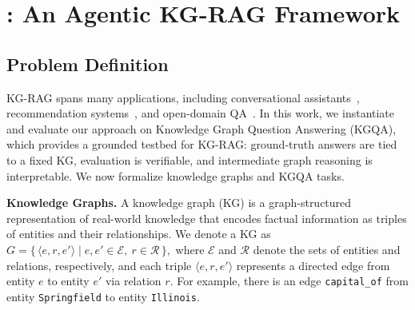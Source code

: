 \section{\framework{}: An Agentic KG-RAG Framework}
\label{sec:kg_r1}

\subsection{Problem Definition}

KG-RAG spans many applications, including conversational assistants~\citep{chaudhuri2021grounding}, recommendation systems~\citep{wang2025knowledge}, and open-domain QA~\citep{zhu2025knowledgegraphguidedretrievalaugmented}. In this work, we instantiate and evaluate our approach on Knowledge Graph Question Answering (KGQA), which provides a grounded testbed for KG-RAG: ground-truth answers are tied to a fixed KG, evaluation is verifiable, and intermediate graph reasoning is interpretable. We now formalize knowledge graphs and KGQA tasks.


\noindent\textbf{Knowledge Graphs.} A knowledge graph (KG) is a graph-structured representation of real-world knowledge that encodes factual information as triples of entities and their relationships. We denote a KG as
\(
G=\{\,\langle e,r,e'\rangle \mid e,e'\!\in\!\mathcal{E},\ r\!\in\!\mathcal{R}\,\},
\)
where \(\mathcal{E}\) and \(\mathcal{R}\) denote the sets of entities and relations, respectively, and each triple \(\langle e,r,e'\rangle\) represents a directed edge from entity \(e\) to entity \(e'\) via relation \(r\). For example, there is an edge \texttt{\small{capital\_of}} from entity \texttt{\small{Springfield}} to entity \texttt{\small{Illinois}}.

